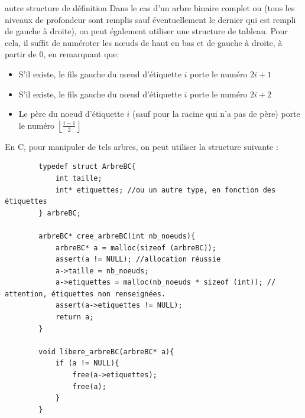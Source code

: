 \begin{exemple}{7.13}{autre structure de définition}
    Dans le cas d'un arbre binaire complet ou  (tous les niveaux de profondeur sont remplis sauf éventuellement le dernier qui est rempli de gauche à droite), on peut également utiliser une structure de tableau. Pour cela, il suffit de numéroter les nœuds de haut en bas et de gauche à droite, à partir de 0, en remarquant que: 
    \begin{itemize}
        \item S'il existe, le fils gauche du nœud d'étiquette $i$ porte le numéro $2i + 1$
        \item S'il existe, le fils gauche du nœud d'étiquette $i$ porte le numéro $2i + 2$
        \item Le père du noeud d'étiquette $i$ (sauf pour la racine qui n'a pas de père) porte le numéro $\left\lfloor \frac{i-1}{2}\right\rfloor $
    \end{itemize}
    \begin{center}
\end{center}
    
    En C, pour manipuler de tels arbres, on peut utiliser la structure suivante :
    \begin{verbatim}
        typedef struct ArbreBC{
            int taille;
            int* etiquettes; //ou un autre type, en fonction des étiquettes
        } arbreBC;

        arbreBC* cree_arbreBC(int nb_noeuds){
            arbreBC* a = malloc(sizeof (arbreBC));
            assert(a != NULL); //allocation réussie
            a->taille = nb_noeuds;
            a->etiquettes = malloc(nb_noeuds * sizeof (int)); // attention, étiquettes non renseignées.
            assert(a->etiquettes != NULL);
            return a;
        }

        void libere_arbreBC(arbreBC* a){
            if (a != NULL){
                free(a->etiquettes);
                free(a);
            }
        }
    \end{verbatim}
\end{exemple}

